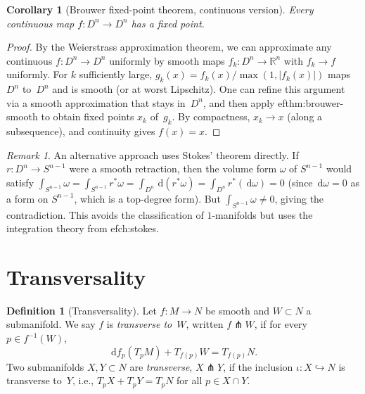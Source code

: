 \documentclass[12pt,a4paper,openany]{book}
\newtheorem{corollary}[theorem]{Corollary}
\theoremstyle{definition}
\newtheorem{definition}[theorem]{Definition}
\theoremstyle{remark}
\newtheorem{remark}[theorem]{Remark}
\newcommand{\R}{\mathbb{R}}
\newcommand{\dd}{\,\mathrm{d}}
\newcommand{\abs}[1]{\left\lvert #1 \right\rvert}
\begin{document}
\begin{corollary}[Brouwer fixed-point theorem, continuous version]
  \label{cor:brouwer-continuous}
Every continuous map $f\colon D^n\to D^n$ has a fixed point.
\end{corollary}

\begin{proof}
By the Weierstrass approximation theorem, we can approximate any
continuous $f\colon D^n\to D^n$ uniformly by smooth maps
$f_k\colon D^n\to\R^n$ with $f_k\to f$ uniformly.  For $k$
sufficiently large, $g_k(x) = f_k(x)/\max(1,\abs{f_k(x)})$
maps $D^n$ to~$D^n$ and is smooth (or at worst Lipschitz).  One can
refine this argument via a smooth approximation that stays in~$D^n$,
and then apply 
ef{thm:brouwer-smooth} to obtain fixed
points $x_k$ of~$g_k$.  By compactness, $x_k\to x$ (along a
subsequence), and continuity gives $f(x) = x$.
\end{proof}

\begin{remark}\label{rem:brouwer-alternative}
An alternative approach uses Stokes' theorem directly.  If
$r\colon D^n\to S^{n-1}$ were a smooth retraction, then the volume
form $\omega$ of $S^{n-1}$ would satisfy
$\int_{S^{n-1}}\omega = \int_{S^{n-1}} r^*\omega = \int_{D^n}\dd(r^*\omega)
= \int_{D^n} r^*(\dd\omega) = 0$ (since $\dd\omega = 0$ as a form on
$S^{n-1}$, which is a top-degree form).  But $\int_{S^{n-1}}\omega\ne 0$,
giving the contradiction.  This avoids the classification of
$1$-manifolds but uses the integration theory from 
ef{ch:stokes}.
\end{remark}

\section{Transversality}\label{sec:transversality}

\begin{definition}[Transversality]\label{def:transversality}
Let $f\colon M\to N$ be smooth and $W\subset N$ a submanifold.  We say
$f$ is \emph{transverse to~$W$}, written $f\pitchfork W$, if for every
$p\in f^{-1}(W)$,
\[
  \dd f_p(T_pM) + T_{f(p)}W = T_{f(p)}N.
\]
Two submanifolds $X,Y\subset N$ are \emph{transverse}, $X\pitchfork Y$,
if the inclusion $\iota\colon X\hookrightarrow N$ is transverse to~$Y$,
i.e., $T_pX + T_pY = T_pN$ for all $p\in X\cap Y$.
\end{definition}
\end{document}
